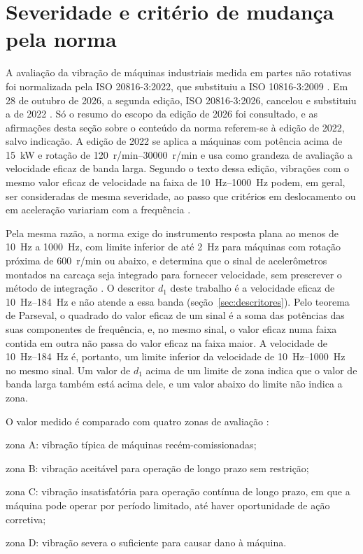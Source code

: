 \section{Severidade e critério de mudança pela norma}\label{sec:fund-norma}

A avaliação da vibração de máquinas industriais medida em partes não rotativas foi normalizada pela ISO 20816-3:2022, que substituiu a ISO 10816-3:2009 . Em 28 de outubro de 2026, a segunda edição, ISO 20816-3:2026, cancelou e substituiu a de 2022 \cite{iso208163_2026}. Só o resumo do escopo da edição de 2026 foi consultado, e as afirmações desta seção sobre o conteúdo da norma referem-se à edição de 2022, salvo indicação. A edição de 2022 se aplica a máquinas com potência acima de \SI{15}{\kilo\watt} e rotação de \SIrange{120}{30000}{r/min} e usa como grandeza de avaliação a velocidade eficaz de banda larga. Segundo o texto dessa edição, vibrações com o mesmo valor eficaz de velocidade na faixa de \SIrange{10}{1000}{\hertz} podem, em geral, ser consideradas de mesma severidade, ao passo que critérios em deslocamento ou em aceleração variariam com a frequência \cite{iso208163_2022}.

Pela mesma razão, a norma exige do instrumento resposta plana ao menos de \SI{10}{\hertz} a \SI{1000}{\hertz}, com limite inferior de até \SI{2}{\hertz} para máquinas com rotação próxima de \SI{600}{r/min} ou abaixo, e determina que o sinal de acelerômetros montados na carcaça seja integrado para fornecer velocidade, sem prescrever o método de integração \cite{iso208163_2022}. O descritor $d_1$ deste trabalho é a velocidade eficaz de \SIrange{10}{184}{\hertz} e não atende a essa banda (seção~\ref{sec:descritores}). Pelo teorema de Parseval, o quadrado do valor eficaz de um sinal é a soma das potências das suas componentes de frequência, e, no mesmo sinal, o valor eficaz numa faixa contida em outra não passa do valor eficaz na faixa maior. A velocidade de \SIrange{10}{184}{\hertz} é, portanto, um limite inferior da velocidade de \SIrange{10}{1000}{\hertz} no mesmo sinal. Um valor de $d_1$ acima de um limite de zona indica que o valor de banda larga também está acima dele, e um valor abaixo do limite não indica a zona.

O valor medido é comparado com quatro zonas de avaliação \cite{iso208163_2022}:
\begin{alineas}
  \item zona A: vibração típica de máquinas recém-comissionadas;
  \item zona B: vibração aceitável para operação de longo prazo sem restrição;
  \item zona C: vibração insatisfatória para operação contínua de longo prazo, em que a máquina pode operar por período limitado, até haver oportunidade de ação corretiva;
  \item zona D: vibração severa o suficiente para causar dano à máquina.
\end{alineas}

